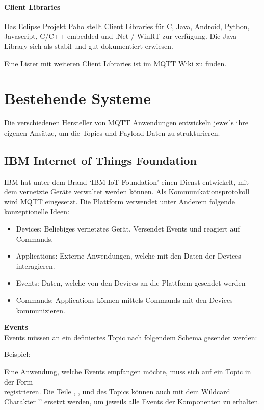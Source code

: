 \paragraph{Client Libraries}

Das Eclipse Projekt Paho \cite{paho} stellt Client Libraries für C, Java, Android, Python,
 Javascript, C/C++ embedded und .Net / WinRT zur verfügung. Die Java Library sich als stabil und gut dokumentiert erwiesen.

Eine Lister mit weiteren Client Libraries ist im MQTT Wiki \cite{clientLibs} zu finden.



\section{Bestehende Systeme}
Die verschiedenen Hersteller von MQTT Anwendungen entwickeln jeweils ihre eigenen Ansätze, um die Topics und Payload Daten zu strukturieren. 


\subsection{IBM Internet of Things Foundation}

IBM hat unter dem Brand `IBM IoT Foundation' \cite{ibmIotF:home} einen Dienst entwickelt, mit dem vernetzte Geräte verwaltet werden können. Als Kommunikationsprotokoll wird MQTT eingesetzt. Die Plattform verwendet unter Anderem folgende konzeptionelle Ideen:
\begin{itemize}
	\item Devices: Beliebiges vernetztes Gerät. Versendet Events und reagiert auf Commands.
	\item Applications: Externe Anwendungen, welche mit den Daten der Devices interagieren.
	\item Events: Daten, welche von den Devices an die Plattform gesendet werden
	\item Commands: Applications können mittels Commands mit den Devices kommunizieren.
\end{itemize}

\textbf{Events} \\
Events müssen an ein definiertes Topic nach folgendem Schema gesendet werden: \\

Beispiel: 

Eine Anwendung, welche Events empfangen möchte, muss sich auf ein Topic in der Form \\
 registrieren.
Die Teile , ,  und  des Topics können auch mit dem Wildcard Charakter '\code{+}' ersetzt werden, um jeweils alle Events der Komponenten zu erhalten. 

